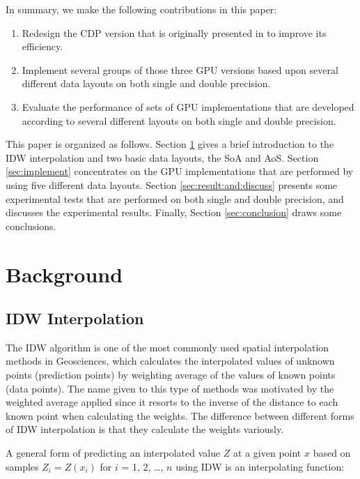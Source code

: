 In summary, we make the following contributions in this paper:

\begin{enumerate}[label=(\arabic*)]
\item Redesign the CDP version that is originally presented in \cite{mei2014} to improve its efficiency.

\item Implement several groups of those three GPU versions based upon several different data layouts
on both single and double precision. 

\item Evaluate the performance of sets of GPU implementations that are developed 
according to several different layouts on both single and double precision.
\end{enumerate}

This paper is organized as follows. Section \ref{sec:background} gives a brief 
introduction to the IDW interpolation and two basic 
data layouts, the SoA and AoS. Section \ref{sec:implement} concentrates on the 
GPU implementations that are performed  by using five different 
data layouts. Section \ref{sec:result:and:discuss} presents some experimental tests that are performed 
on both single and double precision, and discusses the experimental results. Finally, 
Section \ref{sec:conclusion} draws some conclusions.


\section{Background}
\label{sec:background}

\subsection{IDW Interpolation}
\label{sec:back:idw}

The IDW algorithm is one of the most commonly used spatial interpolation 
methods in Geosciences, which calculates the interpolated values of unknown 
points (prediction points) by weighting average of the values of known 
points (data points). The name given to this type of methods was motivated 
by the weighted average applied since it resorts to the inverse of the 
distance to each known point when calculating the weights. The difference 
between different forms of IDW interpolation is that they calculate the 
weights variously. 

A general form of predicting an interpolated value $Z$ at a given point $x$ based 
on samples $Z_{i}=Z(x_{i})$ for $i$ = 1, 2, {\ldots}, $n$ using IDW is an 
interpolating function: 

